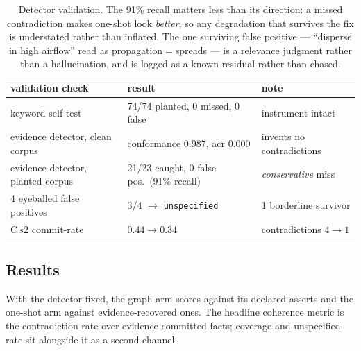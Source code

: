 \documentclass[11pt]{article}
\newcommand{\code}[1]{\texttt{\small #1}}
\begin{document}
\begin{table}[h]
\centering
\begin{tabular}{@{}lll@{}}
\toprule
validation check & result & note \\
\midrule
keyword self-test & 74/74 planted, 0 missed, 0 false & instrument intact \\
evidence detector, clean corpus & conformance 0.987, acr 0.000 & invents no contradictions \\
evidence detector, planted corpus & 21/23 caught, 0 false pos.\ (91\% recall) & \emph{conservative} miss \\
4 eyeballed false positives & 3/4 $\to$ \code{unspecified} & 1 borderline survivor \\
C\,$s2$ commit-rate & $0.44 \to 0.34$ & contradictions $4 \to 1$ \\
\bottomrule
\end{tabular}
\caption{Detector validation. The 91\% recall matters less than its direction: a missed
contradiction makes one-shot look \emph{better}, so any degradation that survives the fix is
understated rather than inflated. The one surviving false positive --- ``disperse in high
airflow'' read as propagation$=$spreads --- is a relevance judgment rather than a hallucination,
and is logged as a known residual rather than chased.}
\end{table}

\subsection*{Results}
With the detector fixed, the graph arm scores against its declared asserts and the one-shot arm
against evidence-recovered ones. The headline coherence metric is the contradiction rate over
evidence-committed facts; coverage and unspecified-rate sit alongside it as a second channel.
\end{document}
